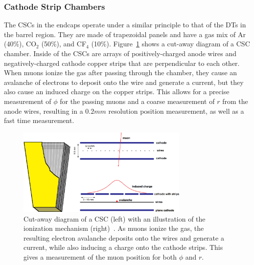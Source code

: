 \subsubsection{Cathode Strip Chambers}

The CSCs in the endcaps operate under a similar principle to that of the DTs in the barrel region.
They are made of trapezoidal panels and have a gas mix of Ar (40\%), CO$_2$ (50\%), and CF$_4$ (10\%).
Figure~\ref{fig:CMSCSC} shows a cut-away diagram of a CSC chamber.
Inside of the CSCs are arrays of positively-charged anode wires and negatively-charged cathode copper strips that are perpendicular to each other.
When muons ionize the gas after passing through the chamber, they cause an avalanche of electrons to deposit onto the wire and generate a current, but they also cause an induced charge on the copper strips.
This allows for a precise measurement of $\phi$ for the passing muons and a coarse measurement of $r$ from the anode wires, resulting in a $0.2\unit{mm}$ resolution position measurement, as well as a fast time measurement.

\begin{figure}[htbp]
  \centering
  \includegraphics[width=0.75\textwidth]{fig/experiment/cms_csc.pdf}
  \caption[
    Cut-away diagram of a CSC (left) with an illustration of the ionization mechanism (right).
    As muons ionize the gas, the resulting electron avalanche deposits onto the wires and generate a current, while also inducing a charge onto the cathode strips.
    This gives a measurement of the muon position for both $\phi$ and $r$.
  ]{
    Cut-away diagram of a CSC (left) with an illustration of the ionization mechanism (right)~\cite{collaboration_2013}.
    As muons ionize the gas, the resulting electron avalanche deposits onto the wires and generate a current, while also inducing a charge onto the cathode strips.
    This gives a measurement of the muon position for both $\phi$ and $r$.
  }
  \label{fig:CMSCSC}
\end{figure}

